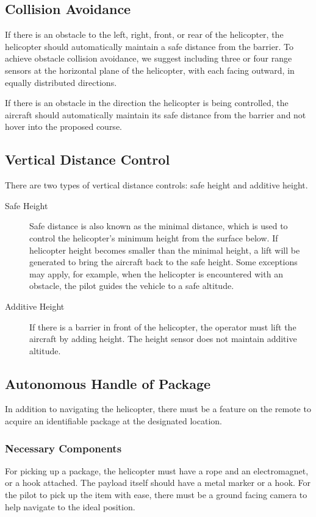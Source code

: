 \documentclass[onecolumn, oneside, letterpaper, draftclsnofoot, 10pt, compsoc]{IEEEtran}
\begin{document}
\subsection{Collision Avoidance}
If there is an obstacle to the left, right, front, or rear of the helicopter, the helicopter should automatically maintain a safe distance from the barrier. To achieve obstacle collision avoidance, we suggest including three or four range sensors at the horizontal plane of the helicopter, with each facing outward, in equally distributed directions.

If there is an obstacle in the direction the helicopter is being controlled, the aircraft should automatically maintain its safe distance from the barrier and not hover into the proposed course.

\subsection{Vertical Distance Control}
There are two types of vertical distance controls: safe height and additive height.
\begin{description}
\item [Safe Height] Safe distance is also known as the minimal distance, which is used to control the helicopter's minimum height from the surface below. If helicopter height becomes smaller than the minimal height, a lift will be generated to bring the aircraft back to the safe height. Some exceptions may apply, for example, when the helicopter is encountered with an obstacle, the pilot guides the vehicle to a safe altitude.
\item [Additive Height] If there is a barrier in front of the helicopter, the operator must lift the aircraft by adding height. The height sensor does not maintain additive altitude.
\end{description}

\subsection{Autonomous Handle of Package}
In addition to navigating the helicopter, there must be a feature on the remote to acquire an identifiable package at the designated location.

\subsubsection{Necessary Components}
For picking up a package, the helicopter must have a rope and an electromagnet, or a hook attached. The payload itself should have a metal marker or a hook. For the pilot to pick up the item with ease, there must be a ground facing camera to help navigate to the ideal position.
\end{document}
